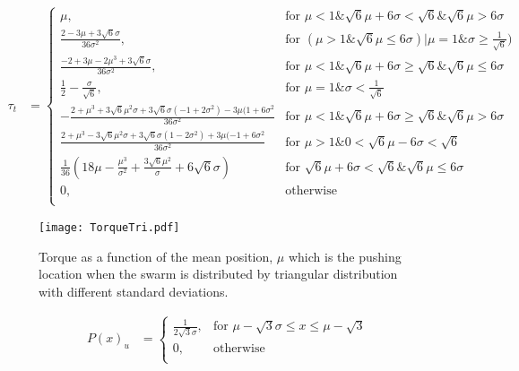 \lipsum[1]
\begin{strip}
\begin{align}
\tau_t &=  \left\{
\begin{array}{ll}
    \mu, &   \textrm{for     }\mu<1 \& \sqrt{6} \mu + 6 \sigma < \sqrt{6} \& \sqrt{6} \mu > 6 \sigma\\
    \frac{2-3\mu+3\sqrt{6}\sigma}{36\sigma^2}, & \textrm{for     } (\mu>1\&\sqrt{6}\mu \leq 6\sigma) | \mu =1 \& \sigma \geq \frac{1}{\sqrt{6}})\\
    \frac{-2+3\mu-2\mu^3+3\sqrt{6}\sigma}{36\sigma^2}, &   \textrm{for     } \mu<1 \& \sqrt{6}\mu+6\sigma\geq \sqrt{6} \& \sqrt{6} \mu \leq 6\sigma\\
    \frac{1}{2}-\frac{\sigma}{\sqrt{6}}, &   \textrm{for     } \mu = 1 \& \sigma < \frac{1}{\sqrt{6}}\\
    -\frac{2+\mu^3+3\sqrt{6}\mu^2\sigma+3\sqrt{6}\sigma(-1+2\sigma^2)-3\mu(1+6\sigma^2}{36\sigma^2} &  \textrm{for     } \mu<1 \& \sqrt{6} \mu + 6 \sigma \geq \sqrt{6} \& \sqrt{6} \mu > 6 \sigma\\
    \frac{2+\mu^3-3\sqrt{6}\mu^2\sigma+3\sqrt{6}\sigma(1-2\sigma^2)+3\mu(-1+6\sigma^2}{36\sigma^2} &  \textrm{for     } \mu>1 \& 0<\sqrt{6}\mu-6\sigma<\sqrt{6}\\
    \frac{1}{36}(18\mu-\frac{\mu^3}{\sigma^2} + \frac{3\sqrt{6}\mu^2}{\sigma}+6\sqrt{6}\sigma) &  \textrm{for     }  \sqrt{6} \mu+6\sigma<\sqrt{6}\&\sqrt{6}\mu\leq 6\sigma\\
     0, &  \textrm{otherwise}\\ 
\end{array} 
\right.
\end{align}
\end{strip}
\lipsum[3-5]

\begin{figure}
\begin{center}
	\texttt{[image: TorqueTri.pdf]}
\end{center}
\vspace{-1em}
\caption{\label{fig:torqueTri}
Torque as a function of the mean position, $\mu$ which is the pushing location when the swarm is distributed by triangular distribution with different standard deviations.
}
\vspace{-1em}
\end{figure}


\begin{align}
P(x)_{u} &=  \left\{
\begin{array}{ll}
    \frac{1}{2\sqrt{3}\sigma}, &  \textrm{for   } \mu-\sqrt{3}\sigma \leq x \leq \mu-\sqrt{3}\\
     0, & \textrm{otherwise}\\
\end{array} 
\right.
\end{align}

